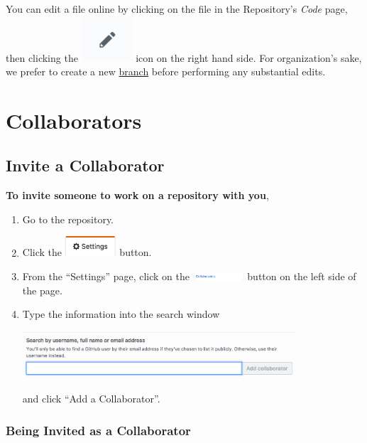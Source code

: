 \documentclass[11pt]{article}
\begin{document}
You can edit a file online by clicking on the file in the Repository's \textit{Code} page, then clicking the \includegraphics[width=0.75in]{pencil} icon on the right hand side. For organization's sake, we prefer to create a new \hyperlink{branch-section}{branch} before performing any substantial edits. 

\section{Collaborators}

\subsection{Invite a Collaborator} 

\textbf{To invite someone to work on a repository with you},

\begin{enumerate}
\item Go to the repository.
\item Click the \includegraphics[width=0.75in]{SettingsButton} button.  
\item From the ``Settings'' page, click on the \includegraphics[width=0.75in]{CollaboratorsButton} button on the left side of the page.
\item Type the information into the search window \begin{center} 
\includegraphics[width=0.8\textwidth]{CollaboratorSearchImage}
\end{center}
and click ``Add a Collaborator''. 
\end{enumerate}

\subsubsection{Being Invited as a Collaborator}
\end{document}
